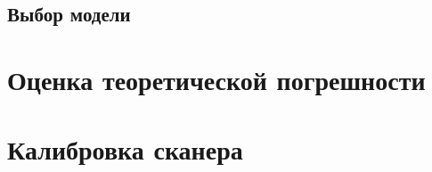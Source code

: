         \subsection{Выбор модели}

    \section{Оценка теоретической погрешности}
    
    \section{Калибровка сканера}